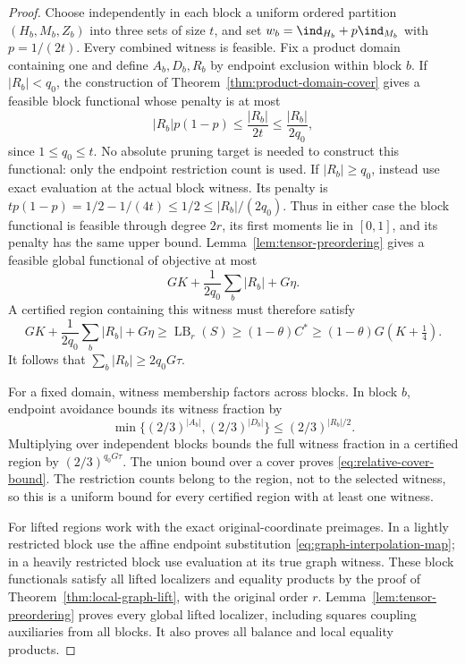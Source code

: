 \begin{proof}
Choose independently in each block a uniform ordered partition
$(H_b,M_b,Z_b)$ into three sets of size $t$, and set
$w_b=\ind_{H_b}+p\ind_{M_b}$ with $p=1/(2t)$.
Every combined witness is feasible. Fix a product domain containing one
and define $A_b,D_b,R_b$ by endpoint exclusion within block $b$.
If $|R_b|<q_0$, the construction of
Theorem~\ref{thm:product-domain-cover} gives a feasible block functional
whose penalty is at most
\[
 |R_b|p(1-p)\le\frac{|R_b|}{2t}
                    \le\frac{|R_b|}{2q_0},
\]
since $1\le q_0\le t$. No absolute pruning target is needed to construct
this functional: only the endpoint restriction count is used.
If $|R_b|\ge q_0$, instead use exact evaluation at the actual block
witness. Its penalty is
$tp(1-p)=1/2-1/(4t)\le1/2\le |R_b|/(2q_0)$.
Thus in either case the block functional is feasible through degree
$2r$, its first moments lie in $[0,1]$, and its penalty has the same
upper bound. Lemma~\ref{lem:tensor-preordering} gives a feasible global
functional of objective at most
\begin{equation}\label{eq:relative-witness-bound}
 GK+\frac1{2q_0}\sum_b|R_b|+G\eta.
\end{equation}
A certified region containing this witness must therefore satisfy
\[
 GK+\frac1{2q_0}\sum_b|R_b|+G\eta
 \ge\operatorname{LB}_r(S)\ge(1-\theta)C^*
 \ge(1-\theta)G(K+\tfrac14).
\]
It follows that $\sum_b|R_b|\ge2q_0G\tau$.

For a fixed domain, witness membership factors across blocks. In block
$b$, endpoint avoidance bounds its witness fraction by
\[
 \min\{(2/3)^{|A_b|},(2/3)^{|D_b|}\}
 \le(2/3)^{|R_b|/2}.
\]
Multiplying over independent blocks bounds the full witness fraction in
a certified region by $(2/3)^{q_0G\tau}$. The union bound over a cover
proves \eqref{eq:relative-cover-bound}. The restriction counts belong
to the region, not to the selected witness, so this is a uniform bound
for every certified region with at least one witness.

For lifted regions work with the exact original-coordinate preimages.
In a lightly restricted block use the affine endpoint substitution
\eqref{eq:graph-interpolation-map}; in a heavily restricted block use
evaluation at its true graph witness. These block functionals satisfy all
lifted localizers and equality products by the proof of
Theorem~\ref{thm:local-graph-lift}, with the original order $r$.
Lemma~\ref{lem:tensor-preordering} proves every global lifted localizer,
including squares coupling auxiliaries from all blocks. It also proves
all balance and local equality products.


\end{proof}
